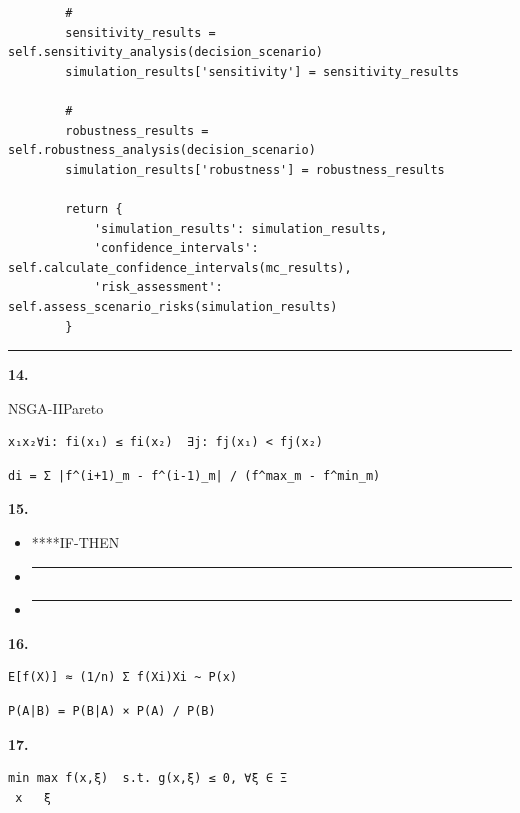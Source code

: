 \begin{verbatim}
        # 
        sensitivity_results = self.sensitivity_analysis(decision_scenario)
        simulation_results['sensitivity'] = sensitivity_results
        
        # 
        robustness_results = self.robustness_analysis(decision_scenario)
        simulation_results['robustness'] = robustness_results
        
        return {
            'simulation_results': simulation_results,
            'confidence_intervals': self.calculate_confidence_intervals(mc_results),
            'risk_assessment': self.assess_scenario_risks(simulation_results)
        }
\end{verbatim}

\begin{center}\rule{0.5\linewidth}{0.5pt}\end{center}

\textbf{14. }

NSGA-IIPareto

\begin{verbatim}
x₁x₂∀i: fi(x₁) ≤ fi(x₂)  ∃j: fj(x₁) < fj(x₂)
\end{verbatim}

\begin{verbatim}
di = Σ |f^(i+1)_m - f^(i-1)_m| / (f^max_m - f^min_m)
\end{verbatim}

\textbf{15. }

\begin{itemize}
\item
  ****IF-THEN
\item
  \begin{center}\rule{0.5\linewidth}{0.5pt}\end{center}
\item
  \begin{center}\rule{0.5\linewidth}{0.5pt}\end{center}
\end{itemize}

\textbf{16. }

\begin{verbatim}
E[f(X)] ≈ (1/n) Σ f(Xi)Xi ~ P(x)
\end{verbatim}

\begin{verbatim}
P(A|B) = P(B|A) × P(A) / P(B)
\end{verbatim}

\textbf{17. }

\begin{verbatim}
min max f(x,ξ)  s.t. g(x,ξ) ≤ 0, ∀ξ ∈ Ξ
 x   ξ
\end{verbatim}

